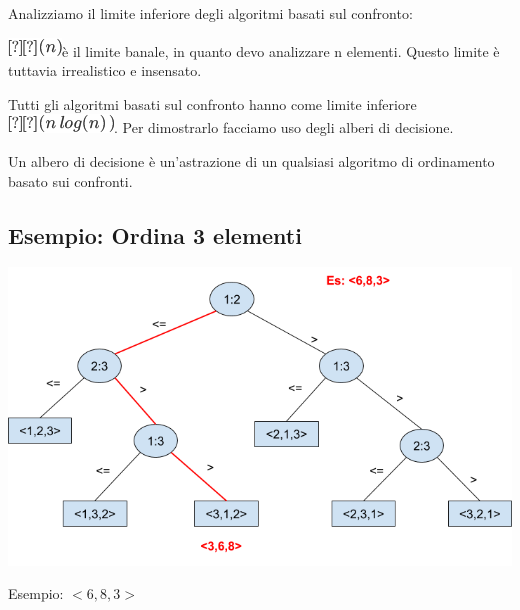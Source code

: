 \documentclass{article}
\begin{document}
{}

{Analizziamo il limite inferiore degli algoritmi basati sul confronto:}

\includegraphics{images/image149.png}{è il limite banale, in quanto devo
analizzare n elementi. Questo limite è tuttavia irrealistico e
insensato.}

{}

{Tutti gli algoritmi basati sul confronto hanno come limite inferiore
}\includegraphics{images/image153.png}{. Per dimostrarlo facciamo uso
degli }{alberi di decisione.}

{}

{Un albero di decisione è un'astrazione di un qualsiasi algoritmo di
ordinamento basato sui confronti.}

\hypertarget{h.oynrnvh2y1cp}{\subsection{\texorpdfstring{{Esempio:
Ordina 3 elementi}}{Esempio: Ordina 3 elementi}}\label{h.oynrnvh2y1cp}}

{}

{\includegraphics{images/image531.png}}

Esempio: $<6,8,3>$

\end{document}
